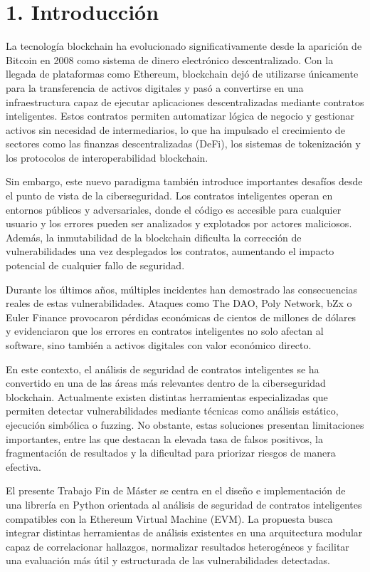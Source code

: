 \section{1. Introducción}\label{introducciuxf3n}

La tecnología blockchain ha evolucionado significativamente desde la
aparición de Bitcoin en 2008 como sistema de dinero electrónico
descentralizado. Con la llegada de plataformas como Ethereum, blockchain
dejó de utilizarse únicamente para la transferencia de activos digitales
y pasó a convertirse en una infraestructura capaz de ejecutar
aplicaciones descentralizadas mediante contratos inteligentes. Estos
contratos permiten automatizar lógica de negocio y gestionar activos sin
necesidad de intermediarios, lo que ha impulsado el crecimiento de
sectores como las finanzas descentralizadas (DeFi), los sistemas de
tokenización y los protocolos de interoperabilidad blockchain.

Sin embargo, este nuevo paradigma también introduce importantes desafíos
desde el punto de vista de la ciberseguridad. Los contratos inteligentes
operan en entornos públicos y adversariales, donde el código es
accesible para cualquier usuario y los errores pueden ser analizados y
explotados por actores maliciosos. Además, la inmutabilidad de la
blockchain dificulta la corrección de vulnerabilidades una vez
desplegados los contratos, aumentando el impacto potencial de cualquier
fallo de seguridad.

Durante los últimos años, múltiples incidentes han demostrado las
consecuencias reales de estas vulnerabilidades. Ataques como The DAO,
Poly Network, bZx o Euler Finance provocaron pérdidas económicas de
cientos de millones de dólares y evidenciaron que los errores en
contratos inteligentes no solo afectan al software, sino también a
activos digitales con valor económico directo.

En este contexto, el análisis de seguridad de contratos inteligentes se
ha convertido en una de las áreas más relevantes dentro de la
ciberseguridad blockchain. Actualmente existen distintas herramientas
especializadas que permiten detectar vulnerabilidades mediante técnicas
como análisis estático, ejecución simbólica o fuzzing. No obstante,
estas soluciones presentan limitaciones importantes, entre las que
destacan la elevada tasa de falsos positivos, la fragmentación de
resultados y la dificultad para priorizar riesgos de manera efectiva.

El presente Trabajo Fin de Máster se centra en el diseño e
implementación de una librería en Python orientada al análisis de
seguridad de contratos inteligentes compatibles con la Ethereum Virtual
Machine (EVM). La propuesta busca integrar distintas herramientas de
análisis existentes en una arquitectura modular capaz de correlacionar
hallazgos, normalizar resultados heterogéneos y facilitar una evaluación
más útil y estructurada de las vulnerabilidades detectadas.

